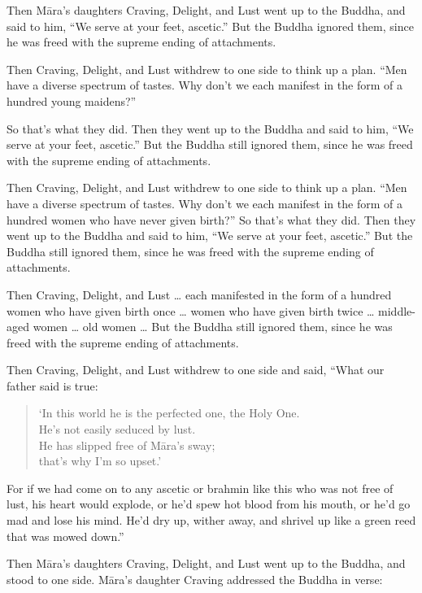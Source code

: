 \documentclass[12pt,openany]{book}%
\begin{document}
Then \textsanskrit{Māra}’s daughters Craving, Delight, and Lust went up to the Buddha, and said to him, “We serve at your feet, ascetic.” But the Buddha ignored them, since he was freed with the supreme ending of attachments. 

Then Craving, Delight, and Lust withdrew to one side to think up a plan. “Men have a diverse spectrum of tastes. Why don’t we each manifest in the form of a hundred young maidens?” 

So that’s what they did. Then they went up to the Buddha and said to him, “We serve at your feet, ascetic.” But the Buddha still ignored them, since he was freed with the supreme ending of attachments. 

Then Craving, Delight, and Lust withdrew to one side to think up a plan. “Men have a diverse spectrum of tastes. Why don’t we each manifest in the form of a hundred women who have never given birth?” So that’s what they did. Then they went up to the Buddha and said to him, “We serve at your feet, ascetic.” But the Buddha still ignored them, since he was freed with the supreme ending of attachments. 

Then Craving, Delight, and Lust … each manifested in the form of a hundred women who have given birth once … women who have given birth twice … middle-aged women … old women … But the Buddha still ignored them, since he was freed with the supreme ending of attachments. 

Then Craving, Delight, and Lust withdrew to one side and said, “What our father said is true: 

\begin{verse}%
‘In this world he is the perfected one, the Holy One. \\
He’s not easily seduced by lust. \\
He has slipped free of \textsanskrit{Māra}’s sway; \\
that’s why I’m so upset.’ 

%
\end{verse}

For if we had come on to any ascetic or brahmin like this who was not free of lust, his heart would explode, or he’d spew hot blood from his mouth, or he’d go mad and lose his mind. He’d dry up, wither away, and shrivel up like a green reed that was mowed down.” 

Then \textsanskrit{Māra}’s daughters Craving, Delight, and Lust went up to the Buddha, and stood to one side. \textsanskrit{Māra}’s daughter Craving addressed the Buddha in verse: 
\end{document}
